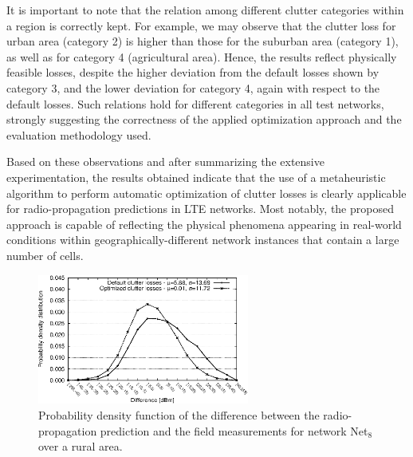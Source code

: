 It is important to note that the relation among different clutter
categories within a region is correctly kept. For example, we may
observe that the clutter loss for urban area (category 2) is higher
than those for the suburban area (category 1), as well as for category
4 (agricultural area). Hence, the results reflect physically feasible
losses, despite the higher deviation from the default losses shown
by category 3, and the lower deviation for category 4, again with
respect to the default losses. Such relations hold for different categories
in all test networks, strongly suggesting the correctness of the applied
optimization approach and the evaluation methodology used.

Based on these observations and after summarizing the extensive experimentation,
the results obtained indicate that the use of a metaheuristic algorithm
to perform automatic optimization of clutter losses is clearly applicable
for radio-propagation predictions in LTE networks. Most notably, the
proposed approach is capable of reflecting the physical phenomena
appearing in real-world conditions within geographically-different
network instances that contain a large number of cells.

\bigskip{}


\begin{figure}
\centering

\includegraphics[width=0.62\textwidth]{05-framework_parameter_tuning/img/rural-diff_distribution}

\caption{Probability density function of the difference between the radio-propagation
prediction and the field measurements for network Net$_{8}$ over
a rural area.\label{fig:05-Clutter_error_distribution_for_Net8}}


\vspace{-0.5cm}
\end{figure}


